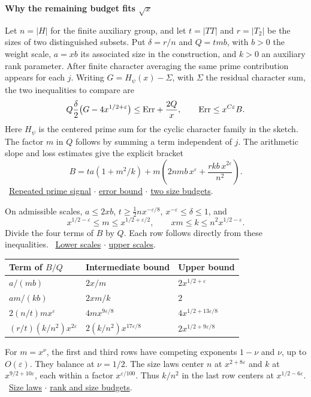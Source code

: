 \documentclass[11pt,letterpaper]{article}
\newcommand{\heading}[1]{{\sffamily\bfseries\fontsize{22}{25}\selectfont #1\par}\vspace{2pt}}
\newcommand{\links}[1]{\unskip\ {\small\sffamily\color{muted}#1}}
\newcommand{\repo}{https://github.com/TomasOrtega/RH/blob/a6ac91a412dcbaab31801355ec5707024a71bf65/extracted/lean/src/}
\newcommand{\src}[3]{\href{\repo#1.lean\#L#2}{#3}}
\newcommand{\swin}{Formalism/SizeWindowBrackets/}
\newcommand{\core}{Development/AutomorphicArithmetic/DedekindLFunctions/LandauTheorems/}
\newcommand{\eps}{\varepsilon}
\begin{document}
\newpage
{}
\heading{Why the remaining budget fits \(\sqrt{x}\)}
Let \(n=|H|\) for the finite auxiliary group, and let \(t=|TT|\) and \(r=|T_2|\) be the sizes of two distinguished subsets. Put \(\delta=r/n\) and \(Q=tmb\), with \(b>0\) the weight scale, \(a=xb\) its associated size in the construction, and \(k>0\) an auxiliary rank parameter. After finite character averaging the same prime contribution appears for each \(j\). Writing \(G=H_\psi(x)-\Sigma\), with \(\Sigma\) the residual character sum, the two inequalities to compare are
\[
 Q\frac{\delta}{2}\bigl(G-4x^{1/2+\eps}\bigr)\le {\rm Err}+\frac{2Q}{x},
 \qquad {\rm Err}\le x^{C\eps}B .
\]
Here \(H_\psi\) is the centered prime sum for the cyclic character family in the sketch. The factor \(m\) in \(Q\) follows by summing a term independent of \(j\). The arithmetic slope and loss estimates give the explicit bracket
\[
 B=t a(1+m^2/k)+m\left(2nmb\,x^\eps+\frac{r k b\,x^{2\eps}}{n^2}\right).
\]
\links{\src{\core ChCore}{302}{Repeated prime signal} $\cdot$ \src{\core ChTop}{37}{error bound} $\cdot$ \src{\swin SChain}{33}{two size budgets}.}

On admissible scales, \(a\le2xb\), \(t\ge \tfrac12 n x^{-\eps/8}\),
\(x^{-\eps}\le\delta\le1\), and
\[
 x^{1/2-\eps}\le m\le x^{1/2+\eps/2},\qquad
                    xm\le k\le n^2 x^{1/2-\eps}.
\]
Divide the four terms of \(B\) by \(Q\). Each row follows directly from these inequalities. \links{\src{\swin SChain}{53}{Lower scales} $\cdot$ \src{\core ChCore}{343}{upper scales}.}

\begin{center}
\renewcommand{\arraystretch}{1.24}
\begin{tabular*}{0.94\linewidth}{@{\extracolsep{\fill}}lll@{}}
\toprule
Term of \(B/Q\) & Intermediate bound & Upper bound\\
\midrule
\(a/(mb)\) & \(2x/m\) & \(2x^{1/2+\eps}\)\\
\(am/(kb)\) & \(2xm/k\) & \(2\)\\
\(2(n/t)m x^\eps\) & \(4m x^{9\eps/8}\) & \(4x^{1/2+13\eps/8}\)\\
\((r/t)(k/n^2)x^{2\eps}\) & \(2(k/n^2)x^{17\eps/8}\) & \(2x^{1/2+9\eps/8}\)\\
\bottomrule
\end{tabular*}
\end{center}

For \(m=x^\nu\), the first and third rows have competing exponents \(1-\nu\) and \(\nu\), up to \(O(\eps)\). They balance at \(\nu=1/2\). The size laws center \(n\) at \(x^{2+8\eps}\) and \(k\) at \(x^{9/2+10\eps}\), each within a factor \(x^{\eps/100}\). Thus \(k/n^2\) in the last row centers at \(x^{1/2-6\eps}\). \links{\src{Formalism/SharpRestriction/ElevenLe}{24}{Size laws} $\cdot$ \src{Formalism/LocalRingCardinality/DataArith}{200}{rank and size budgets}.}
\end{document}
